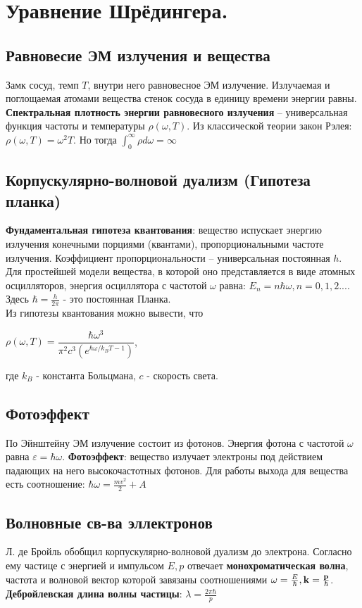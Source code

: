 \section {Уравнение Шрёдингера.}
\subsection*{Равновесие ЭМ излучения и вещества}
Замк сосуд, темп $T$, внутри него равновесное ЭМ излучение. Излучаемая и поглощаемая атомами вещества стенок сосуда в единицу времени энергии равны. {\bf Спектральная плотность энергии равновесного излучения} -- универсальная функция частоты и температуры $\rho(\omega, T) $. Из классической теории закон Рэлея:  $\rho(\omega, T) = \omega^2T$. Но тогда $\int_0^\infty \rho d\omega = \infty$

\subsection*{Корпускулярно-волновой дуализм (Гипотеза планка)}
{\bf Фундаментальная гипотеза квантования}: вещество испускает энергию излучения конечными порциями (квантами), пропорциональными частоте излучения. Коэффициент пропорциональности – универсальная постоянная $h$. Для простейшей модели вещества, в которой оно представляется в виде атомных осцилляторов, энергия осциллятора с частотой $\omega$ равна: $E_n = n\hbar \omega, n = 0,1,2...$. Здесь $\hbar = \frac{h}{2\pi}$ - это постоянная Планка.\\

 Из гипотезы квантования можно вывести, что
\begin{center}
$\rho(\omega, T) = \dfrac{\hbar \omega^3}{\pi^2c^3(e^{\hbar \omega/k_BT - 1})}$,
\end{center}
где $k_B$ - константа Больцмана, $c$ - скорость света.

\subsection*{Фотоэффект}
По Эйнштейну ЭМ излучение состоит из фотонов. Энергия фотона с частотой $\omega$ равна $\varepsilon = \hbar \omega$. {\bf Фотоэффект}: вещество излучает электроны под действием падающих на него высокочастотных фотонов. Для работы выхода для вещества есть соотношение: $\hbar \omega = \frac{mv^2}{2} + A$

\subsection*{Волновные св-ва эллектронов}
Л. де Бройль обобщил корпускулярно-волновой дуализм до электрона. Согласно ему частице с энергией и импульсом $E, p$ отвечает {\bf монохроматическая волна}, частота и волновой вектор которой завязаны соотношениями $\omega = \frac{E}{\hbar}, {\bf k} = \frac{{\bf p}}{\hbar}$. {\bf Дебройлевская длина волны частицы}: $\lambda = \frac{2\pi \hbar}{ p}$

